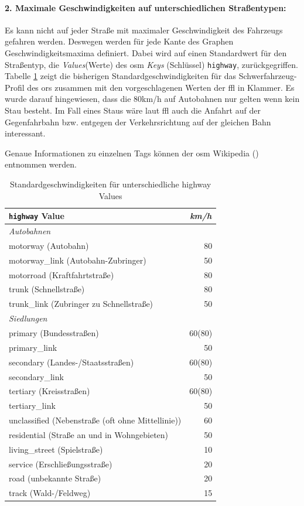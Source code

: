 \documentclass[12pt,a4paper]{article}
\begin{document}
\paragraph*{2. Maximale Geschwindigkeiten auf unterschiedlichen Straßentypen:}
\label{frage2}
Es kann nicht auf jeder Straße mit maximaler Geschwindigkeit des Fahrzeugs gefahren werden. Deswegen werden für jede Kante des Graphen Geschwindigkeitsmaxima definiert.
Dabei wird auf einen Standardwert für den Straßentyp, die \textit{Values}(Werte) des \gls{osm} \textit{Keys} (Schlüssel) \lstinline!highway!, zurückgegriffen.
Tabelle \ref{tab:speedinfo} zeigt die bisherigen Standardgeschwindigkeiten für das Schwerfahrzeug-Profil des \gls{ors} zusammen mit den vorgeschlagenen Werten der \gls{ffl} in Klammer.
Es wurde darauf hingewiesen, dass die 80km/h auf Autobahnen nur gelten wenn kein Stau besteht. Im Fall eines Staus wäre laut \gls{ffl} auch die Anfahrt auf der Gegenfahrbahn bzw. entgegen der Verkehrsrichtung auf der gleichen Bahn interessant.

Genaue Informationen zu einzelnen Tags können der \gls{osm} Wikipedia (\cite{osmwiki}) entnommen werden.

\begin{table}[h]
\centering
\caption{Standardgeschwindigkeiten für unterschiedliche highway Values}
\label{tab:speedinfo}
\begin{tabular}{|l|r|}
\hline
\multicolumn{1}{|l|}{\lstinline!highway! Value}  & \multicolumn{1}{c|}{\textit{km/h}} \\
\hline
\multicolumn{2}{|l|}{\textit{Autobahnen}} \\
\hline
motorway (Autobahn) & 80 \\
motorway\_link (Autobahn-Zubringer) & 50 \\
motorroad (Kraftfahrtstraße) & 80 \\
trunk (Schnellstraße) & 80 \\
trunk\_link (Zubringer zu Schnellstraße) & 50 \\
\hline
\multicolumn{1}{|l}{\textit{Siedlungen}} & \multicolumn{1}{l|}{ } \\
\hline
primary (Bundesstraßen) & 60(80) \\
primary\_link  & 50 \\
secondary (Landes-/Staatsstraßen) & 60(80) \\
secondary\_link  & 50 \\
tertiary (Kreisstraßen) & 60(80) \\
tertiary\_link  & 50 \\
unclassified (Nebenstraße (oft ohne Mittellinie))  & 60 \\
residential (Straße an und in Wohngebieten) & 50 \\
living\_street (Spielstraße)  & 10 \\
service (Erschließungsstraße) & 20 \\
road (unbekannte Straße) & 20 \\
track (Wald-/Feldweg) & 15 \\
\hline
\end{tabular}
\end{table}
\end{document}
